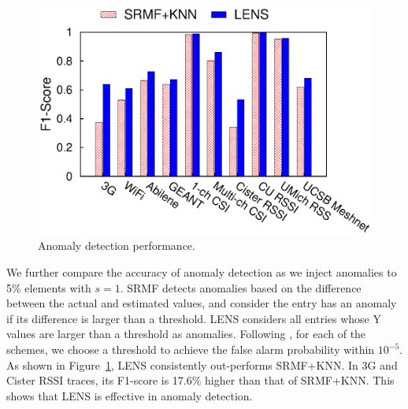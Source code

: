 \begin{figure}[h!]
  \centering
  \includegraphics[width=\figurewidthA]{fig_lens3/dect.bar.PureRandLoss.srmf_based_pred.org.2d.elem.ind.elem1.burst1.na0.05.anom1.noise0.thresh-1.lr0.8.eps}
  \caption{Anomaly detection performance.}
  \label{fig:anomaly-detection-f1-bar}
\end{figure}


 We further compare the accuracy of anomaly
detection as we inject anomalies to 5\% elements with $s=1$.  SRMF
detects anomalies based on the difference between the actual and
estimated values, and consider the entry has an anomaly if its
difference is larger than a threshold. LENS considers all entries
whose Y values are larger than a threshold as anomalies. Following
\cite{zhang09sensing}, for each of the schemes, we choose a threshold to
achieve the false alarm probability within $10^{-5}$. 
As shown in Figure~\ref{fig:anomaly-detection-f1-bar}, LENS
consistently out-performs SRMF+KNN. In 3G and Cister RSSI traces, its
F1-score is 17.6\% higher than that of SRMF+KNN. This shows that LENS is
effective in anomaly detection. 



